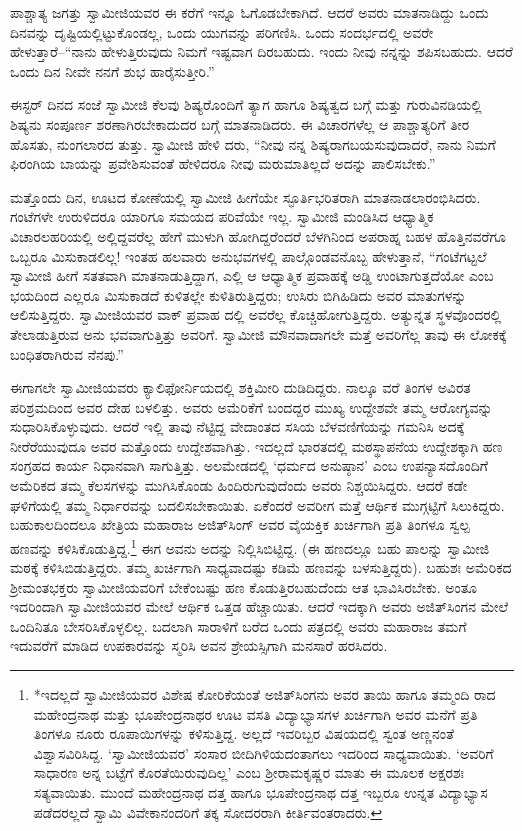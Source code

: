 ಪಾಶ್ಚಾತ್ಯ ಜಗತ್ತು ಸ್ವಾಮೀಜಿಯವರ ಈ ಕರೆಗೆ ಇನ್ನೂ ಓಗೊಡಬೇಕಾಗಿದೆ. ಆದರೆ ಅವರು ಮಾತನಾಡಿದ್ದು ಒಂದು ದಿನವನ್ನು ದೃಷ್ಟಿಯಲ್ಲಿಟ್ಟುಕೊಂಡಲ್ಲ, ಒಂದು ಯುಗವನ್ನು ಪರಿಗಣಿಸಿ. ಒಂದು ಸಂದರ್ಭದಲ್ಲಿ ಅವರೇ ಹೇಳುತ್ತಾರೆ–“ನಾನು ಹೇಳುತ್ತಿರುವುದು ನಿಮಗೆ ಇಷ್ಟವಾಗ ದಿರಬಹುದು. ಇಂದು ನೀವು ನನ್ನನ್ನು ಶಪಿಸಬಹುದು. ಆದರೆ ಒಂದು ದಿನ ನೀವೇ ನನಗೆ ಶುಭ ಹಾರೈಸುತ್ತೀರಿ.”

ಈಸ್ಟರ್ ದಿನದ ಸಂಜೆ ಸ್ವಾಮೀಜಿ ಕೆಲವು ಶಿಷ್ಯರೊಂದಿಗೆ ತ್ಯಾಗ ಹಾಗೂ ಶಿಷ್ಯತ್ವದ ಬಗ್ಗೆ ಮತ್ತು ಗುರುವಿನಡಿಯಲ್ಲಿ ಶಿಷ್ಯನು ಸಂಪೂರ್ಣ ಶರಣಾಗಿರಬೇಕಾದುದರ ಬಗ್ಗೆ ಮಾತನಾಡಿದರು. ಈ ವಿಚಾರಗಳೆಲ್ಲ ಆ ಪಾಶ್ಚಾತ್ಯರಿಗೆ ತೀರ ಹೊಸತು, ನುಂಗಲಾರದ ತುತ್ತು. ಸ್ವಾಮೀಜಿ ಹೇಳಿ ದರು, “ನೀವು ನನ್ನ ಶಿಷ್ಯರಾಗಬಯಸುವುದಾದರೆ, ನಾನು ನಿಮಗೆ ಫಿರಂಗಿಯ ಬಾಯನ್ನು ಪ್ರವೇಶಿಸುವಂತೆ ಹೇಳಿದರೂ ನೀವು ಮರುಮಾತಿಲ್ಲದೆ ಅದನ್ನು ಪಾಲಿಸಬೇಕು.”

ಮತ್ತೊಂದು ದಿನ, ಊಟದ ಕೋಣೆಯಲ್ಲಿ ಸ್ವಾಮೀಜಿ ಹೀಗೆಯೇ ಸ್ಫೂರ್ತಿಭರಿತರಾಗಿ ಮಾತನಾಡಲಾರಂಭಿಸಿದರು. ಗಂಟೆಗಳೇ ಉರುಳಿದರೂ ಯಾರಿಗೂ ಸಮಯದ ಪರಿವೆಯೇ ಇಲ್ಲ. ಸ್ವಾಮೀಜಿ ಮಂಡಿಸಿದ ಆಧ್ಯಾತ್ಮಿಕ ವಿಚಾರಲಹರಿಯಲ್ಲಿ ಅಲ್ಲಿದ್ದವರೆಲ್ಲ ಹೇಗೆ ಮುಳುಗಿ ಹೋಗಿದ್ದರೆಂದರೆ ಬೆಳಗಿನಿಂದ ಅಪರಾಹ್ನ ಬಹಳ ಹೊತ್ತಿನವರೆಗೂ ಒಬ್ಬರೂ ಮಿಸುಕಾಡಲಿಲ್ಲ! ಇಂತಹ ಹಲವಾರು ಅನುಭವಗಳಲ್ಲಿ ಪಾಲ್ಗೊಂಡವನೊಬ್ಬ ಹೇಳುತ್ತಾನೆ, “ಗಂಟೆಗಟ್ಟಲೆ ಸ್ವಾಮೀಜಿ ಹೀಗೆ ಸತತವಾಗಿ ಮಾತನಾಡುತ್ತಿದ್ದಾಗ, ಎಲ್ಲಿ ಆ ಆಧ್ಯಾತ್ಮಿಕ ಪ್ರವಾಹಕ್ಕೆ ಅಡ್ಡಿ ಉಂಟಾಗುತ್ತದೆಯೋ ಎಂಬ ಭಯದಿಂದ ಎಲ್ಲರೂ ಮಿಸುಕಾಡದೆ ಕುಳಿತಲ್ಲೇ ಕುಳಿತಿರುತ್ತಿದ್ದರು; ಉಸಿರು ಬಿಗಿಹಿಡಿದು ಅವರ ಮಾತುಗಳನ್ನು ಆಲಿಸುತ್ತಿದ್ದರು. ಸ್ವಾಮೀಜಿಯವರ ವಾಕ್ ಪ್ರವಾಹ ದಲ್ಲಿ ಅವರೆಲ್ಲ ಕೊಚ್ಚಿಹೋಗುತ್ತಿದ್ದರು. ಅತ್ಯುನ್ನತ ಸ್ಥಳವೊಂದರಲ್ಲಿ ತೇಲಾಡುತ್ತಿರುವ ಅನು ಭವವಾಗುತ್ತಿತ್ತು ಅವರಿಗೆ. ಸ್ವಾಮೀಜಿ ಮೌನವಾದಾಗಲೇ ಮತ್ತೆ ಅವರಿಗೆಲ್ಲ ತಾವು ಈ ಲೋಕಕ್ಕೆ ಬಂಧಿತರಾಗಿರುವ ನೆನಪು.”

ಈಗಾಗಲೇ ಸ್ವಾಮೀಜಿಯವರು ಕ್ಯಾಲಿಫೋರ್ನಿಯದಲ್ಲಿ ಶಕ್ತಿಮೀರಿ ದುಡಿದಿದ್ದರು. ನಾಲ್ಕೂ ವರೆ ತಿಂಗಳ ಅವಿರತ ಪರಿಶ್ರಮದಿಂದ ಅವರ ದೇಹ ಬಳಲಿತ್ತು. ಅವರು ಅಮೆರಿಕೆಗೆ ಬಂದದ್ದರ ಮುಖ್ಯ ಉದ್ದೇಶವೇ ತಮ್ಮ ಆರೋಗ್ಯವನ್ನು ಸುಧಾರಿಸಿಕೊಳ್ಳುವುದು. ಆದರೆ ಇಲ್ಲಿ ತಾವು ನೆಟ್ಟಿದ್ದ ವೇದಾಂತದ ಸಸಿಯ ಬೆಳವಣಿಗೆಯನ್ನು ಗಮನಿಸಿ ಅದಕ್ಕೆ ನೀರೆರೆಯುವುದೂ ಅವರ ಮತ್ತೊಂದು ಉದ್ದೇಶವಾಗಿತ್ತು. ಇದಲ್ಲದೆ ಭಾರತದಲ್ಲಿ ಮಠಸ್ಥಾಪನೆಯ ಉದ್ದೇಶಕ್ಕಾಗಿ ಹಣ ಸಂಗ್ರಹದ ಕಾರ್ಯ ನಿಧಾನವಾಗಿ ಸಾಗುತ್ತಿತ್ತು. ಅಲಮೇಡದಲ್ಲಿ ‘ಧರ್ಮದ ಅನುಷ್ಠಾನ’ ಎಂಬ ಉಪನ್ಯಾಸದೊಂದಿಗೆ ಅಮೆರಿಕದ ತಮ್ಮ ಕೆಲಸಗಳನ್ನು ಮುಗಿಸಿಕೊಂಡು ಹಿಂದಿರುಗುವುದೆಂದು ಅವರು ನಿಶ್ಚಯಿಸಿದ್ದರು. ಆದರೆ ಕಡೇ ಘಳಿಗೆಯಲ್ಲಿ ತಮ್ಮ ನಿರ್ಧಾರವನ್ನು ಬದಲಿಸಬೇಕಾಯಿತು. ಏಕೆಂದರೆ ಅವರೀಗ ಮತ್ತೆ ಆರ್ಥಿಕ ಮುಗ್ಗಟ್ಟಿಗೆ ಸಿಲುಕಿದ್ದರು. ಬಹುಕಾಲದಿಂದಲೂ ಖೇತ್ರಿಯ ಮಹಾರಾಜ ಅಜಿತ್​ಸಿಂಗ್ ಅವರ ವೈಯಕ್ತಿಕ ಖರ್ಚಿಗಾಗಿ ಪ್ರತಿ ತಿಂಗಳೂ ಸ್ವಲ್ಪ ಹಣವನ್ನು ಕಳಿಸಿಕೊಡುತ್ತಿದ್ದ.\footnote{*ಇದಲ್ಲದೆ ಸ್ವಾಮೀಜಿಯವರ ವಿಶೇಷ ಕೋರಿಕೆಯಂತೆ ಅಜಿತ್​ಸಿಂಗನು ಅವರ ತಾಯಿ ಹಾಗೂ ತಮ್ಮಂದಿ ರಾದ ಮಹೇಂದ್ರನಾಥ ಮತ್ತು ಭೂಪೇಂದ್ರನಾಥರ ಊಟ ವಸತಿ ವಿದ್ಯಾಭ್ಯಾಸಗಳ ಖರ್ಚಿಗಾಗಿ ಅವರ ಮನೆಗೆ ಪ್ರತಿ ತಿಂಗಳೂ ನೂರು ರೂಪಾಯಿಗಳನ್ನು ಕಳಿಸುತ್ತಿದ್ದ. ಅಲ್ಲದೆ ಇವರಿಬ್ಬರ ವಿಷಯದಲ್ಲಿ ಸ್ವಂತ ಅಣ್ಣನಂತೆ ವಿಶ್ವಾಸವಿರಿಸಿದ್ದ. ‘ಸ್ವಾಮೀಜಿಯವರ’ ಸಂಸಾರ ಬೀದಿಗಿಳಿಯದಂತಾಗಲು ಇದರಿಂದ ಸಾಧ್ಯವಾಯಿತು. ‘ಅವರಿಗೆ ಸಾಧಾರಣ ಅನ್ನ ಬಟ್ಟೆಗೆ ಕೊರತೆಯಿರುವುದಿಲ್ಲ’ ಎಂಬ ಶ್ರೀರಾಮಕೃಷ್ಣರ ಮಾತು ಈ ಮೂಲಕ ಅಕ್ಷರಶಃ ಸತ್ಯವಾಯಿತು. ಮುಂದೆ ಮಹೇಂದ್ರನಾಥ ದತ್ತ ಹಾಗೂ ಭೂಪೇಂದ್ರನಾಥ ದತ್ತ ಇಬ್ಬರೂ ಉನ್ನತ ವಿದ್ಯಾಭ್ಯಾಸ ಪಡೆದರಲ್ಲದೆ ಸ್ವಾಮಿ ವಿವೇಕಾನಂದರಿಗೆ ತಕ್ಕ ಸೋದರರಾಗಿ ಕೀರ್ತಿವಂತರಾದರು.} ಈಗ ಅವನು ಅದನ್ನು ನಿಲ್ಲಿಸಿಬಿಟ್ಟಿದ್ದ. (ಈ ಹಣದಲ್ಲೂ ಬಹು ಪಾಲನ್ನು ಸ್ವಾಮೀಜಿ ಮಠಕ್ಕೆ ಕಳಿಸಿಬಿಡುತ್ತಿದ್ದರು. ತಮ್ಮ ಖರ್ಚಿಗಾಗಿ ಸಾಧ್ಯವಾದಷ್ಟು ಕಡಿಮೆ ಹಣವನ್ನು ಬಳಸುತ್ತಿದ್ದರು). ಬಹುಶಃ ಅಮೆರಿಕದ ಶ್ರೀಮಂತಭಕ್ತರು ಸ್ವಾಮೀಜಿಯವರಿಗೆ ಬೇಕೆಂಬಷ್ಟು ಹಣ ಕೊಡುತ್ತಿರಬಹುದೆಂದು ಆತ ಭಾವಿಸಿರಬೇಕು. ಅಂತೂ ಇದರಿಂದಾಗಿ ಸ್ವಾಮೀಜಿಯವರ ಮೇಲೆ ಆರ್ಥಿಕ ಒತ್ತಡ ಹೆಚ್ಚಾಯಿತು. ಆದರೆ ಇದಕ್ಕಾಗಿ ಅವರು ಅಜಿತ್​ಸಿಂಗನ ಮೇಲೆ ಒಂದಿನಿತೂ ಬೇಸರಿಸಿಕೊಳ್ಳಲಿಲ್ಲ. ಬದಲಾಗಿ ಸಾರಾಳಿಗೆ ಬರೆದ ಒಂದು ಪತ್ರದಲ್ಲಿ ಅವರು ಮಹಾರಾಜ ತಮಗೆ ಇದುವರೆಗೆ ಮಾಡಿದ ಉಪಕಾರವನ್ನು ಸ್ಮರಿಸಿ ಅವನ ಶ್ರೇಯಸ್ಸಿಗಾಗಿ ಮನಸಾರೆ ಹರಸಿದರು.

